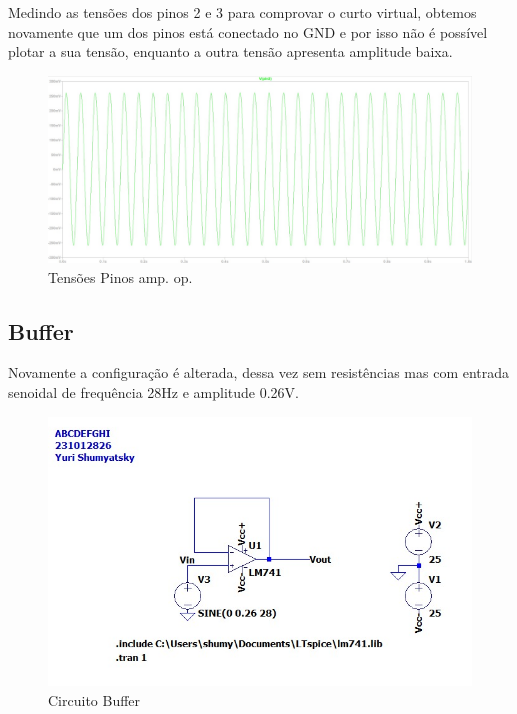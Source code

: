 \documentclass[10pt,twocolumn,letterpaper]{article}
\begin{document}
Medindo as tensões dos pinos 2 e 3 para comprovar o curto virtual, obtemos novamente que um dos pinos está conectado no GND e por isso não é possível plotar a sua tensão, enquanto a outra tensão apresenta amplitude baixa. 

\newpage
\begin{figure}[h]
\caption{Tensões Pinos amp. op.}
\begin{center}
\includegraphics[scale=0.15]{figuras/fig10}
\end{center}
\end{figure}


\subsection{Buffer}

Novamente a configuração é alterada, dessa vez sem resistências mas com entrada senoidal de frequência 28Hz e amplitude 0.26V. 

\begin{figure}[h]
\caption{Circuito Buffer}
\begin{center}
\includegraphics[scale=0.2]{figuras/fig11}
\end{center}
\end{figure}
\end{document}
